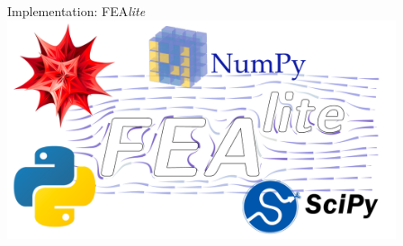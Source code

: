 \documentclass{beamer}
\begin{document}
    \begin{frame}{Implementation: FEA\textit{lite}}
        \hspace{-0.72cm}
        \includegraphics[width=4.5in]{technology.pdf}

    \end{frame}
\end{document}

